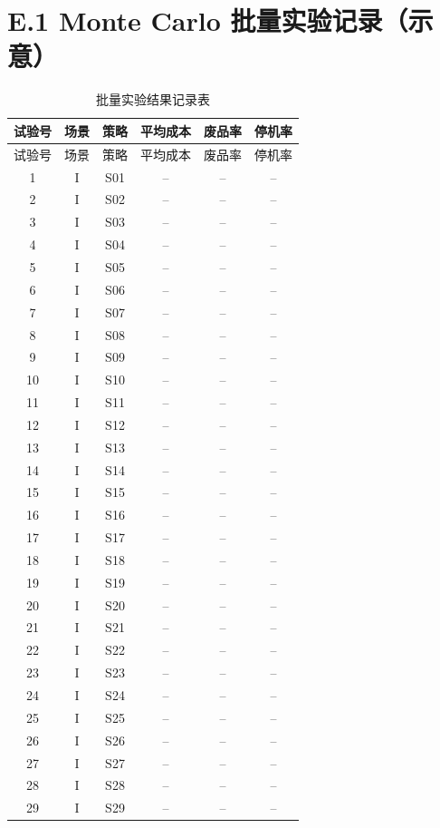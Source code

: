 \section*{E.1 Monte Carlo 批量实验记录（示意）}
\small
\begin{longtable}{cccccc}
\caption{批量实验结果记录表}\\
\toprule
试验号 & 场景 & 策略 & 平均成本 & 废品率 & 停机率\\
\midrule
\endfirsthead
\toprule
试验号 & 场景 & 策略 & 平均成本 & 废品率 & 停机率\\
\midrule
\endhead
1 & I & S01 & -- & -- & --\\
2 & I & S02 & -- & -- & --\\
3 & I & S03 & -- & -- & --\\
4 & I & S04 & -- & -- & --\\
5 & I & S05 & -- & -- & --\\
6 & I & S06 & -- & -- & --\\
7 & I & S07 & -- & -- & --\\
8 & I & S08 & -- & -- & --\\
9 & I & S09 & -- & -- & --\\
10 & I & S10 & -- & -- & --\\
11 & I & S11 & -- & -- & --\\
12 & I & S12 & -- & -- & --\\
13 & I & S13 & -- & -- & --\\
14 & I & S14 & -- & -- & --\\
15 & I & S15 & -- & -- & --\\
16 & I & S16 & -- & -- & --\\
17 & I & S17 & -- & -- & --\\
18 & I & S18 & -- & -- & --\\
19 & I & S19 & -- & -- & --\\
20 & I & S20 & -- & -- & --\\
21 & I & S21 & -- & -- & --\\
22 & I & S22 & -- & -- & --\\
23 & I & S23 & -- & -- & --\\
24 & I & S24 & -- & -- & --\\
25 & I & S25 & -- & -- & --\\
26 & I & S26 & -- & -- & --\\
27 & I & S27 & -- & -- & --\\
28 & I & S28 & -- & -- & --\\
29 & I & S29 & -- & -- & --\\

\end{longtable}
